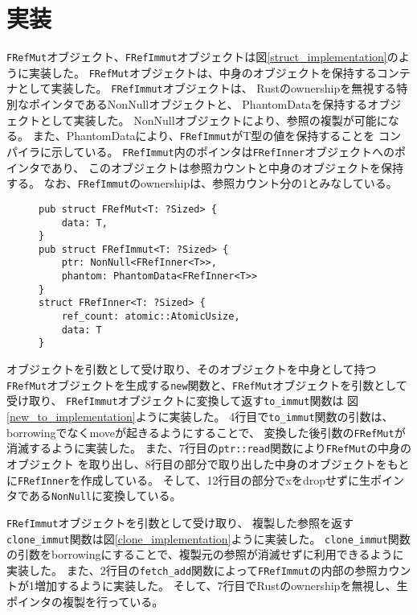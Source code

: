 \documentclass{sumiilab-paper}
\theoremstyle{mystyle}
\numberwithin{definition}{chapter} %
\begin{document}
\afterpage{\clearpage}
\newpage
\section{実装}
\texttt{FRefMut}オブジェクト、\texttt{FRefImmut}オブジェクトは図\ref{struct_implementation}のように実装した。
\texttt{FRefMut}オブジェクトは、中身のオブジェクトを保持するコンテナとして実装した。
\texttt{FRefImmut}オブジェクトは、
Rustのownershipを無視する特別なポインタであるNonNullオブジェクトと、
PhantomDataを保持するオブジェクトとして実装した。
NonNullオブジェクトにより、参照の複製が可能になる。
また、PhantomDataにより、\texttt{FRefImmut}がT型の値を保持することを
コンパイラに示している。
\texttt{FRefImmut}内のポインタは\texttt{FRefInner}オブジェクトへのポインタであり、
このオブジェクトは参照カウントと中身のオブジェクトを保持する。
なお、\texttt{FRefImmut}のownershipは、参照カウント分の1とみなしている。
\begin{figure}[htp]
\begin{lstlisting}[caption=新たな参照オブジェクトの実装, label=struct_implementation, captionpos=b]
pub struct FRefMut<T: ?Sized> {
    data: T,
}
pub struct FRefImmut<T: ?Sized> {
    ptr: NonNull<FRefInner<T>>,
    phantom: PhantomData<FRefInner<T>>
}
struct FRefInner<T: ?Sized> {
    ref_count: atomic::AtomicUsize,
    data: T
}
\end{lstlisting}
\end{figure}

オブジェクトを引数として受け取り、そのオブジェクトを中身として持つ\texttt{FRefMut}オブジェクトを生成する\texttt{new}関数と、\texttt{FRefMut}オブジェクトを引数として受け取り、
\texttt{FRefImmut}オブジェクトに変換して返す\texttt{to\_immut}関数は
図\ref{new_to_implementation}ように実装した。
4行目で\texttt{to\_immut}関数の引数は、borrowingでなくmoveが起きるようにすることで、
変換した後引数の\texttt{FRefMut}が消滅するように実装した。
また、7行目の\texttt{ptr::read}関数により\texttt{FRefMut}の中身のオブジェクト
を取り出し、8行目の部分で取り出した中身のオブジェクトをもとに\texttt{FRefInner}を作成している。
そして、12行目の部分でxをdropせずに生ポインタである\texttt{NonNull}に変換している。

\texttt{FRefImmut}オブジェクトを引数として受け取り、
複製した参照を返す\texttt{clone\_immut}関数は図\ref{clone_implementation}ように実装した。
\texttt{clone\_immut}関数の引数をborrowingにすることで、複製元の参照が消滅せずに利用できるように実装した。
また、2行目の\texttt{fetch\_add}関数によって\texttt{FRefImmut}の内部の参照カウントが1増加するように実装した。
そして、7行目でRustのownershipを無視し、生ポインタの複製を行っている。
\end{document}
